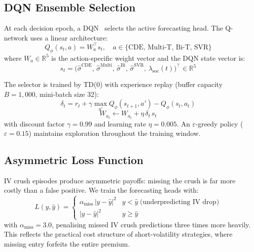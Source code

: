 \documentclass[10pt,twocolumn]{article}
\newcommand{\R}{\mathbb{R}}
\newcommand{\lamsoc}{\lambda_{\mathrm{soc}}}
\begin{document}
\subsection{DQN Ensemble Selection}

At each decision epoch, a DQN~\cite{mnih2015} selects the active forecasting
head. The Q-network uses a linear architecture:
\begin{equation}
\label{eq:dqn}
Q_\phi(s_t,a)=W_a^\top s_t,\quad
a\in\{\mathrm{CDE},\,\mathrm{Multi\text{-}T},\,\mathrm{Bi\text{-}T},\,\mathrm{SVR}\}
\end{equation}
where $W_a\in\R^5$ is the action-specific weight vector and the DQN state
vector is:
\begin{equation}
\label{eq:dqn_state}
s_t=\bigl(\hat{\sigma}^{\mathrm{CDE}},\,\hat{\sigma}^{\mathrm{Multi}},\,
\hat{\sigma}^{\mathrm{Bi}},\,\hat{\sigma}^{\mathrm{SVR}},\,\lamsoc(t)\bigr)^\top
\in\R^5
\end{equation}

The selector is trained by TD(0) with experience replay (buffer capacity
$B=1{,}000$, mini-batch size 32):
\begin{equation}
\label{eq:td}
\delta_t=r_t+\gamma\max_{a'}Q_\phi(s_{t+1},a')-Q_\phi(s_t,a_t)
\end{equation}
\begin{equation}
\label{eq:update}
W_{a_t}\leftarrow W_{a_t}+\eta\,\delta_t\,s_t
\end{equation}
with discount factor $\gamma=0.99$ and learning rate $\eta=0.005$. An
$\varepsilon$-greedy policy ($\varepsilon=0.15$) maintains exploration
throughout the training window.

\subsection{Asymmetric Loss Function}

IV crush episodes produce asymmetric payoffs: missing the crush is far more
costly than a false positive. We train the forecasting heads with:
\begin{equation}
\label{eq:loss}
L(y,\hat{y})=\begin{cases}
  \alpha_{\mathrm{miss}}\,|y-\hat{y}|^2 & y<\hat{y}
    \;\text{(underpredicting IV drop)}\\
  |y-\hat{y}|^2 & y\ge\hat{y}
\end{cases}
\end{equation}
with $\alpha_{\mathrm{miss}}=3.0$, penalising missed IV crush predictions
three times more heavily. This reflects the practical cost structure of
short-volatility strategies, where missing entry forfeits the entire premium.
\end{document}
